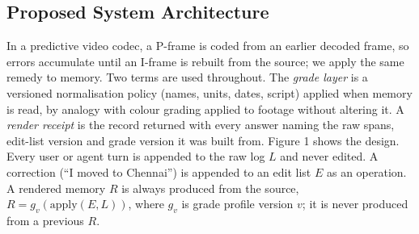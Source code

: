 \subsection{Proposed System Architecture}
In a predictive video codec, a P-frame is coded from an earlier decoded frame, so errors accumulate until an I-frame is rebuilt from the source; we apply the same remedy to memory. Two terms are used throughout. The \textit{grade layer} is a versioned normalisation policy (names, units, dates, script) applied when memory is read, by analogy with colour grading applied to footage without altering it. A \textit{render receipt} is the record returned with every answer naming the raw spans, edit-list version and grade version it was built from.
Figure 1 shows the design. Every user or agent turn is appended to the raw log $L$ and never edited. A correction (``I moved to Chennai'') is appended to an edit list $E$ as an operation. A rendered memory $R$ is always produced from the source, $R = g_v(\mathrm{apply}(E, L))$, where $g_v$ is grade profile version $v$; it is never produced from a previous $R$.

